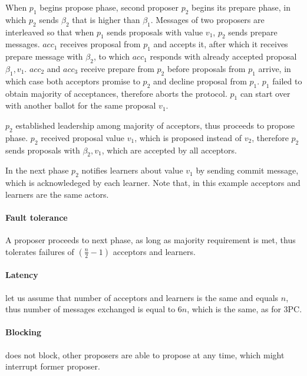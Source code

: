 When $p_1$ begins propose phase, second proposer $p_2$ begins its prepare phase, in which $p_2$ sends $\beta_2$ that is higher than $\beta_1$. Messages of two proposers are interleaved so that when $p_1$ sends proposals with value $v_1$, $p_2$ sends prepare messages. $acc_1$ receives proposal from $p_1$ and accepts it, after which it receives prepare message with $\beta_2$, to which $acc_1$ responds with already accepted proposal $\beta_1,v_1$.
$acc_2$ and $acc_3$ receive prepare from $p_2$ before proposals from $p_1$ arrive, in which case both acceptors promise to $p_2$ and decline proposal from $p_1$. $p_1$ failed to obtain majority of acceptances, therefore aborts the protocol. $p_1$ can start over with another ballot for the same proposal $v_1$. 

$p_2$ established leadership among majority of acceptors, thus proceeds to propose phase. $p_2$ received proposal value $v_1$, which is proposed instead of $v_2$, therefore $p_2$ sends proposals with $\beta_2,v_1$, which are accepted by all acceptors.

 In the next phase $p_2$ notifies learners about value $v_1$ by sending commit message, which is acknowledeged by each learner. Note that, in this example acceptors and learners are the same actors.

 \paragraph{Fault tolerance} A proposer proceeds to next phase, as long as majority requirement is met, thus \paxos tolerates failures of 
 $(\frac{n}{2}-1)$ acceptors and learners.

 \paragraph{Latency} let us assume that number of acceptors and learners is the same and equals $n$, thus number of messages exchanged is equal to $6n$, which is the same, as for 3PC.

 \paragraph{Blocking} \paxos does not block, other proposers are able to propose at any time, which might interrupt former proposer.



